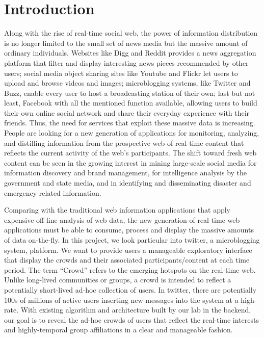 \documentclass{sig-alternate}
\begin{document}
\section{Introduction}
Along with the rise of real-time social web, the power of information
distribution is no longer limited to the small set of news media but the
massive amount of ordinary individuals. Websites like Digg and Reddit provides
a news aggregation platform that filter and display interesting news pieces
recommended by other users; social media object sharing sites like Youtube and
Flickr let users to upload and browse videos and images; microblogging systems,
like Twitter and Buzz, enable every user to host a broadcasting station of
their own; last but not least, Facebook with all the mentioned function
available, allowing users to build their own online social network and share
their everyday experience with their friends. Thus, the need for services that
exploit these massive data is increasing. People are looking for a new
generation of applications for monitoring, analyzing, and distilling
information from the prospective web of real-time content that reflects the
current activity of the web's participants. The shift toward fresh web content
can be seen in the growing interest in mining large-scale social media for
information discovery and brand management, for intelligence analysis by the
government and state media, and in identifying and disseminating disaster and
emergency-related information.

Comparing with the traditional web information applications that apply
expensive off-line analysis of web data, the new generation of real-time web
applications must be able to consume, process and display the massive amounts
of data on-the-fly. In this project, we look particular into twitter, a
microblogging system, platform. We want to provide users a manageable
exploratory interface that display the crowds and their associated
participants/content at each time period. The term ``Crowd'' refers to the
emerging hotspots on the real-time web. Unlike long-lived communities or
groups, a crowd is intended to reflect a potentially short-lived ad-hoc
collection of users. In twitter, there are potentially 100s of millions of
active users inserting new messages into the system at a high-rate. With
existing algorithm and architecture built by our lab in the backend, our goal
is to reveal the ad-hoc crowds of users that reflect the real-time interests
and highly-temporal group affiliations in a clear and manageable fashion.
\end{document}
